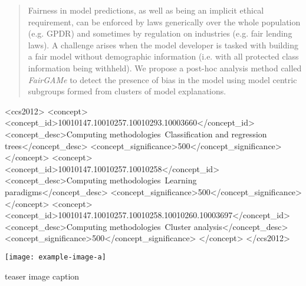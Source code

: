 \documentclass[manuscript,screen,review]{acmart}
\begin{document}
\renewcommand{\shortauthors}{Barr, et al.}

\begin{abstract}
  Fairness in model predictions, as well as being an implicit ethical requirement, can be enforced by laws  generically over the whole population (e.g. GPDR) and sometimes by regulation on industries (e.g. fair lending laws).  A challenge arises when the model developer is tasked with building a fair model without demographic information (i.e. with all protected class information being withheld).  We propose a post-hoc analysis method called \textit{FairGAMe} to detect the presence of bias in the model using model centric subgroups formed from clusters of model explanations.
\end{abstract}

\begin{CCSXML}
<ccs2012>
<concept>
<concept_id>10010147.10010257.10010293.10003660</concept_id>
<concept_desc>Computing methodologies~Classification and regression trees</concept_desc>
<concept_significance>500</concept_significance>
</concept>
<concept>
<concept_id>10010147.10010257.10010258</concept_id>
<concept_desc>Computing methodologies~Learning paradigms</concept_desc>
<concept_significance>500</concept_significance>
</concept>
<concept>
<concept_id>10010147.10010257.10010258.10010260.10003697</concept_id>
<concept_desc>Computing methodologies~Cluster analysis</concept_desc>
<concept_significance>500</concept_significance>
</concept>
</ccs2012>
\end{CCSXML}




  \begin{teaserfigure}
    \texttt{[image: example-image-a]}
    \caption{teaser image caption}
  \end{teaserfigure}
\end{document}
